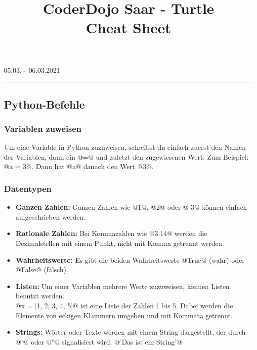 

\title{CoderDojo Saar - Turtle\\\textbf{Cheat Sheet}}


    \maketitle
   
    \begin{center}
        \vspace{-1.5em}
        05.03. - 06.03.2021
        \rule{\textwidth}{1pt}
    \end{center}
  
    \subsection*{Python-Befehle}
    \subsubsection*{Variablen zuweisen}
    Um eine Variable in Python zuzuweisen, schreibst du einfach 
    zuerst den Namen der Variablen, dann ein @=@ und zuletzt den zugewiesenen Wert. Zum Beispiel: @a = 3@. Dann hat @a@ danach den Wert @3@.
    
    \subsubsection*{Datentypen}
    \begin{itemize}
        \item 
        \textbf{Ganzen Zahlen: } 
        Ganzen Zahlen wie @1@, @2@ oder @-3@ können einfach aufgeschrieben werden.

        \item 
        \textbf{Rationale Zahlen: } 
        Bei Kommazahlen wie @3.14@ werden die Dezimalstellen mit einem Punkt, nicht mit Komma getrennt werden. 

        \item 
        \textbf{Wahrheitswerte: }
        Es gibt die beiden Wahrheitswerte @True@ (wahr) oder @False@ (falsch). 

        \item 
        \textbf{Listen: }
        Um einer Variablen mehrere Werte zuzuweisen, können Listen benutzt werden.\\
        @x = [1, 2, 3, 4, 5]@ ist eine Liste der Zahlen 1 bis 5. Dabei werden die Elemente von eckigen Klammern umgeben und mit Kommata getrennt.
        
        \item 
        \textbf{Strings: }
        Wörter oder Texte werden mit einem String dargestellt, der durch @'@ oder @"@ signalisiert wird: @'Das ist ein String'@
    \end{itemize}

